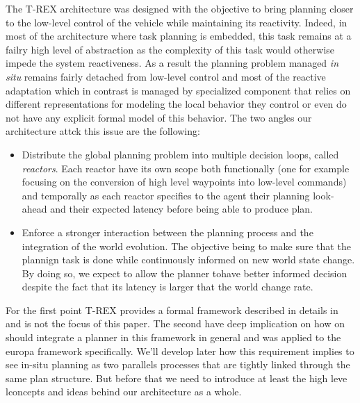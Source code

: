 The T-REX architecture was designed with the objective to bring 
planning closer to the low-level control of the vehicle while
maintaining its reactivity. Indeed, in most of the architecture where
task planning is embedded, this task remains at a failry high level of
abstraction as the complexity of this task would otherwise impede the
system reactiveness. As a result the planning problem managed {\em in
  situ} remains fairly detached from low-level control and most of the 
reactive adaptation which in contrast is managed by specialized 
component that relies on different representations for modeling 
the local behavior they control or even do not have any explicit 
formal model of this behavior. The two angles our architecture attck
this issue are the following:
\begin{itemize}
\item Distribute the global planning problem into multiple decision
  loops, called {\em reactors}. Each reactor have its own scope both 
  functionally (one for example focusing on the conversion of high 
  level waypoints into low-level commands) and temporally as 
  each reactor specifies to the agent their planning look-ahead and
  their expected latency before being able to produce plan.
\item Enforce a stronger interaction between the planning process 
  and the integration of the world evolution. The objective being to
  make sure that the plannign task is done while continuously informed 
  on new world state change. By doing so, we expect to allow the planner
  tohave better informed decision despite the fact that its latency is
  larger that the world change rate.
\end{itemize}

For the first point T-REX provides a formal framework described in
details in \cite{py10} and is not the focus of this paper. The
second have deep implication on how on should integrate a planner in
this framework in general and was applied to the europa framework
specifically. We'll develop later how this requirement implies to see
in-situ planning as two parallels processes that are tightly linked
through the same plan structure. But before that we need to introduce
at least the high leve lconcepts and ideas behind our architecture as
a whole. 

